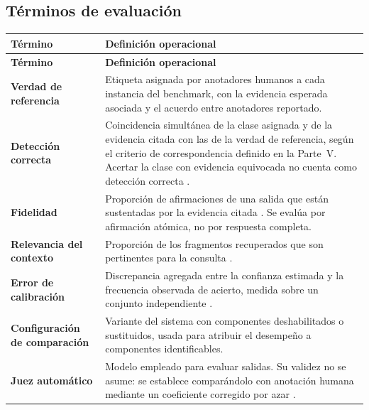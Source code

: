 \subsection{Términos de evaluación}
\label{sec:conc-evaluacion}

\begin{xltabular}{\textwidth}{@{}L{3.6cm} X@{}}
\toprule
\textbf{Término} & \textbf{Definición operacional} \\
\midrule
\endfirsthead
\toprule
\textbf{Término} & \textbf{Definición operacional} \\
\midrule
\endhead
\bottomrule
\endfoot

\textbf{Verdad de referencia} &
Etiqueta asignada por anotadores humanos a cada instancia del benchmark, con la
evidencia esperada asociada y el acuerdo entre anotadores reportado. \\

\textbf{Detección correcta} &
Coincidencia simultánea de la clase asignada y de la evidencia citada con las de la
verdad de referencia, según el criterio de correspondencia definido en la Parte~V.
Acertar la clase con evidencia equivocada no cuenta como detección correcta
\parencite{thorne2018fever}. \\

\textbf{Fidelidad} &
Proporción de afirmaciones de una salida que están sustentadas por la evidencia
citada \parencite{es2024ragas,min2023factscore}. Se evalúa por afirmación atómica, no
por respuesta completa. \\

\textbf{Relevancia del contexto} &
Proporción de los fragmentos recuperados que son pertinentes para la consulta
\parencite{saadfalcon2024ares}. \\

\textbf{Error de calibración} &
Discrepancia agregada entre la confianza estimada y la frecuencia observada de
acierto, medida sobre un conjunto independiente
\parencite{guo2017calibration}. \\

\textbf{Configuración de comparación} &
Variante del sistema con componentes deshabilitados o sustituidos, usada para atribuir
el desempeño a componentes identificables. \\

\textbf{Juez automático} &
Modelo empleado para evaluar salidas. Su validez no se asume: se establece
comparándolo con anotación humana mediante un coeficiente corregido por azar
\parencite{thakur2025judging}. \\
\end{xltabular}

